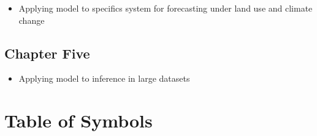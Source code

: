 \begin{itemize}
\tightlist
\item
  Applying model to specifics system for forecasting under land use and
  climate change
\end{itemize}

\hypertarget{chapter-five}{%
\subsection{Chapter Five}\label{chapter-five}}

\begin{itemize}
\tightlist
\item
  Applying model to inference in large datasets
\end{itemize}

\hypertarget{table-of-symbols}{%
\section{Table of Symbols}\label{table-of-symbols}}

